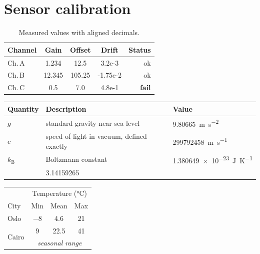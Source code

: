 \documentclass[10pt]{article}
\begin{document}
\section*{Sensor calibration}
\begin{table}[h]
\centering
\caption{Measured values with aligned decimals.}
\begin{tabular}{@{}l S[table-format=2.3] S[table-format=3.1] S[table-format=-1.2e-1] r@{}}
\toprule
\textbf{Channel} & {\textbf{Gain}} & {\textbf{Offset}} & {\textbf{Drift}} & \textbf{Status}\\
\midrule
Ch.\,A & 1.234 & 12.5 & 3.2e-3 & ok\\
Ch.\,B & 12.345 & 105.25 & -1.75e-2 & ok\\
Ch.\,C & 0.5 & 7.0 & 4.8e-1 & \textbf{fail}\\
\bottomrule
\end{tabular}
\end{table}

\begin{tabularx}{\linewidth}{@{}>{\bfseries}l Y >{\centering\arraybackslash}m{36mm}@{}}
\toprule
Quantity & Description & Value\\
\midrule
$g$ & standard gravity near sea level & \SI{9.80665}{\meter\per\second\squared}\\
$c$ & speed of light in vacuum, defined exactly & \SI{299792458}{\meter\per\second}\\
$k_{\mathrm B}$ & Boltzmann constant & \SI{1.380649e-23}{\joule\per\kelvin}\\
\midrule
{} & \num{3.14159265}\\
\bottomrule
\end{tabularx}

\bigskip
\begin{tabular}{@{}l c c c@{}}
\toprule
 & \multicolumn{3}{c}{Temperature (\unit{\celsius})}\\
\cmidrule(lr){2-4}
City & Min & Mean & Max\\
\midrule
Oslo & \num{-8} & \num{4.6} & \num{21}\\
\multirow{2}{*}{Cairo} & \num{9} & \num{22.5} & \num{41}\\
 & \multicolumn{3}{c}{\textit{seasonal range}}\\
\bottomrule
\end{tabular}
\end{document}
